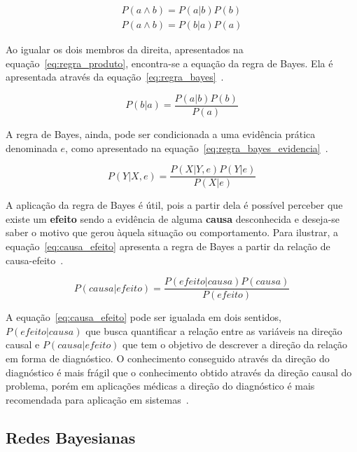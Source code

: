 \begin{subequations}
    \label{eq:regra_produto}
    \begin{align}
        P(a \land b) = P(a|b)P(b)\\
        P(a \land b) = P(b|a)P(a)
    \end{align}
\end{subequations}

Ao igualar os dois membros da direita, apresentados na equação~\ref{eq:regra_produto}, encontra-se a equação da regra de Bayes. Ela é apresentada através da equação~\ref{eq:regra_bayes}~\cite{Russell:2002}.

\begin{equation}
    \label{eq:regra_bayes}
    P(b|a) = \frac{P(a|b)P(b)}{P(a)}
\end{equation}

A regra de Bayes, ainda, pode ser condicionada a uma evidência prática denominada $e$, como apresentado na equação~\ref{eq:regra_bayes_evidencia}~\cite{Russell:2002}.

\begin{equation}
    \label{eq:regra_bayes_evidencia}
    P(Y|X, e) = \frac{P(X|Y, e)P(Y|e)}{P(X|e)}
\end{equation}

A aplicação da regra de Bayes é útil, pois a partir dela é possível perceber que existe um \textbf{efeito} sendo a evidência de alguma \textbf{causa} desconhecida e deseja-se saber o motivo que gerou àquela situação ou comportamento. Para ilustrar, a equação~\ref{eq:causa_efeito} apresenta a regra de Bayes a partir da relação de causa-efeito~\cite{Russell:2002}.

\begin{equation}
    \label{eq:causa_efeito}
    P(causa|efeito) = \frac{P(efeito|causa)P(causa)}{P(efeito)}
\end{equation}

A equação~\ref{eq:causa_efeito} pode ser igualada em dois sentidos, $P(efeito|causa)$ que busca quantificar a relação entre as variáveis na direção causal e $P(causa|efeito)$ que tem o objetivo de descrever a direção da relação em forma de diagnóstico. O conhecimento conseguido através da direção do diagnóstico é mais frágil que o conhecimento obtido através da direção causal do problema, porém em aplicações médicas a direção do diagnóstico é mais recomendada para aplicação em sistemas~\cite{Russell:2002}.

\subsection{Redes Bayesianas}
\label{sec:redes-bayesianas}

